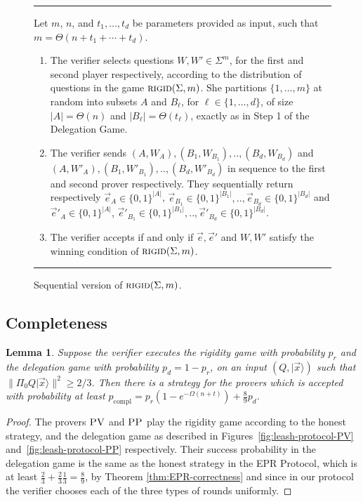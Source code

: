 \documentclass[11pt]{article}
\newtheorem{lemma}[theorem]{Lemma}
\theoremstyle{remark}
\theoremstyle{definition}
\newcommand{\ket}[1]{|#1\rangle}
\newcommand{\rigid}{\textsc{rigid}}
\newcommand{\pv}{\textsc{PV}}
\newcommand{\pp}{\textsc{PP}}
\begin{document}
\begin{figure}[H]
\rule[1ex]{16.5cm}{0.5pt}
\vspace{-25pt}
\justify 
Let $m$, $n$, and $t_1,\ldots,t_d$ be parameters provided as input, such that $m = \Theta(n+t_1+\cdots+t_d)$. 
\begin{enumerate}
\item The verifier selects questions $W,W' \in \Sigma^{m}$, for the first and second player respectively, according to the distribution of questions in the game $\rigid(\Sigma,m)$. She partitions $\{1,\ldots,m\}$ at random into subsets $A$ and $B_\ell$, for $\ell\in\{1,\ldots,d\}$, of size $|A|=\Theta(n)$ and $|B_\ell|=\Theta(t_\ell)$, exactly as in Step 1 of the Delegation Game. 
\item The verifier sends $(A,W_A), (B_1,W_{B_1}),.., (B_d,W_{B_d})$ and $(A,W'_A), (B_1,W'_{B_1}), .., (B_d,W'_{B_d})$ in sequence to the first and second prover respectively. They sequentially return respectively $\vec{e}_A \in \{0,1\}^{|A|}$, $\vec{e}_{B_1} \in \{0,1\}^{|B_1|},.., \vec{e}_{B_d} \in \{0,1\}^{|B_d|}$ and $\vec{e}'_A \in \{0,1\}^{|A|}$, $\vec{e}'_{B_1} \in \{0,1\}^{|B_1|},.., \vec{e}'_{B_d} \in \{0,1\}^{|B_d|}$.
\item The verifier accepts if and only if $\vec{e},\vec{e}'$ and $W,W'$ satisfy the winning condition of $\rigid(\Sigma,m)$.
\end{enumerate}
\rule[2ex]{16.5cm}{0.5pt}\vspace{-.5cm}
\caption{Sequential version of $\rigid(\Sigma,m)$.}
\label{fig:consistency-game}
\end{figure} 




\subsection{Completeness}

\begin{lemma}\label{lem:leash-completeness}
Suppose the verifier executes the rigidity game with probability $p_r$ and the delegation game with probability $p_d=1-p_r$, on an input $(Q,\ket{\vec{x}})$ such that $\|\Pi_0 Q \ket{\vec{x}}\|^2 \geq 2/3$. Then there is a strategy for the provers which is accepted with probability at least $p_{\mathrm{compl}} = p_r(1-e^{-\Omega(n+t)}) + \frac{8}{9}p_d$. 
\end{lemma}

\begin{proof}
The provers $\pv$ and $\pp$ play the rigidity game according to the honest strategy, and the delegation game as described in Figures~\ref{fig:leash-protocol-PV} and~\ref{fig:leash-protocol-PP} respectively. Their success probability in the delegation game is the same as the honest strategy in the EPR Protocol, which is at least $\frac{2}{3}+\frac{2}{3}\frac{1}{3}=\frac{8}{9}$, by Theorem \ref{thm:EPR-correctness} and since in our protocol the verifier chooses each of the three types of rounds uniformly.
\end{proof}
\end{document}
